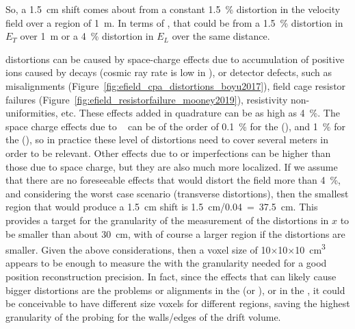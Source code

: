 So, a \SI{1.5}{\cm} shift comes about from a constant \SI{1.5}{\%} distortion in the velocity field over a region of \SI{1}{\m}. In terms of \efield, that could be from a \SI{1.5}{\%} distortion in $E_T$ over \SI{1}{\m} or a \SI{4}{\%} distortion in $E_L$ over the same distance.

\efield distortions can be caused by space-charge effects due to accumulation of positive ions caused by  decays (cosmic ray rate is low in ), or detector defects, such as  misalignments (Figure~\ref{fig:efield_cpa_distortions_boyu2017}), field cage resistor failures (Figure~\ref{fig:efield_resistorfailure_mooney2019}), resistivity non-uniformities, etc.
These effects added in quadrature can be as high as \SI{4}{\%}. 
The space charge effects due to ~\cite{bib:mooney2018} can be of the order of \SI{0.1}{\%} for the  (), and \SI{1}{\%} for the  (), so in practice these level of 
distortions need to cover several meters in order to be relevant.
Other effects due to  or  imperfections can be higher than those due to space charge, but they are also much more localized. If we assume that there are no foreseeable effects that would distort the field more than \SI{4}{\%}, and considering the worst case scenario (transverse distortions), then the smallest region that would produce a \SI{1.5}{\cm} shift is \SI{1.5}{\cm}/\num{0.04}~=~\SI{37.5}{\cm}. This provides a target for the granularity of the measurement of the \efield distortions in $x$ to be smaller than about \SI{30}{\cm}, with of course a larger region if the distortions are smaller. Given the above considerations, then a voxel size of \num{10}$\times$\num{10}$\times$\SI{10}{\cubic\cm} appears to be enough to measure the \efield with the granularity needed for a good position reconstruction precision. In fact, since the effects that can likely cause bigger \efield distortions are the problems or alignments in the  (or ), or in the , it could be conceivable to have different size voxels for different regions, saving the highest granularity of the probing for the walls/edges of the drift volume.


\begin{comment}
\begin{dunetable}
[Calibration Requirements]
{p{0.5\textwidth}p{0.15\textwidth}p{0.15\textwidth}}
{tab:calibreq}
{Calibration Specifications and Goals}   
Requirement & Specification & Goal \\ \toprowrule
\efield measurement precision & < 1\% & ALARA \\ \colhline
\efield measurement coverage & > 75\% & AHARA \\ \colhline
\efield measurement granularity & < 30x30x30 cm & ALARA \\ \colhline
\end{dunetable}
\end{comment}

